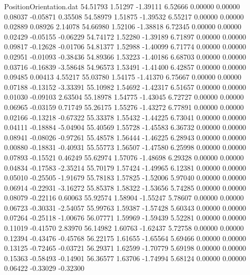 \begin{filecontents}{PositionOrientation.dat}
  54.51793    1.51297   -1.39111     6.52666    0.00000    0.00000    0.08037   -0.05871    0.35508
  54.58979    1.51875   -1.39532     6.55217    0.00000    0.00000    0.02889    0.08926    2.14078
  54.66980    1.52106   -1.38818     6.72345    0.00000    0.00000    0.02429   -0.05155   -0.06229
  54.74172    1.52280   -1.39189     6.71897    0.00000    0.00000    0.09817   -0.12628   -0.01706
  54.81377    1.52988   -1.40099     6.71774    0.00000    0.00000    0.02951   -0.01093   -0.38436
  54.89366    1.53223   -1.40186     6.68703    0.00000    0.00000    0.03716   -0.16839   -3.58648
  54.96573    1.53491   -1.41400     6.42857    0.00000    0.00000    0.09485    0.00413    4.55217
  55.03780    1.54175   -1.41370     6.75667    0.00000    0.00000    0.07188   -0.13152   -3.33391
  55.10982    1.54692   -1.42317     6.51657    0.00000    0.00000    0.01030   -0.09103    2.63504
  55.18978    1.54775   -1.43045     6.72727    0.00000    0.00000    0.06965   -0.03159    0.71749
  55.26175    1.55276   -1.43272     6.77891    0.00000    0.00000    0.02166   -0.13218   -0.67322
  55.33378    1.55432   -1.44225     6.73041    0.00000    0.00000    0.04111   -0.18884   -5.04904
  55.40569    1.55728   -1.45583     6.36732    0.00000    0.00000    0.08941   -0.08026   -0.97261
  55.48578    1.56444   -1.46225     6.28943    0.00000    0.00000    0.00880   -0.18831   -0.40931
  55.55773    1.56507   -1.47580     6.25998    0.00000    0.00000    0.07893   -0.15521    0.46249
  55.62974    1.57076   -1.48698     6.29328    0.00000    0.00000    0.04834   -0.17583   -2.35214
  55.70179    1.57424   -1.49965     6.12381    0.00000    0.00000    0.05010   -0.25505   -1.91679
  55.78183    1.57825   -1.52006     5.97040    0.00000    0.00000    0.06914   -0.22931   -3.16272
  55.85378    1.58322   -1.53656     5.74285    0.00000    0.00000    0.08079   -0.22116    0.60063
  55.92574    1.58904   -1.55247     5.78607    0.00000    0.00000    0.06723   -0.30331   -2.54057
  55.99763    1.59387   -1.57428     5.60343    0.00000    0.00000    0.07264   -0.25118   -1.00676
  56.07771    1.59969   -1.59439     5.52281    0.00000    0.00000    0.11019   -0.41570    2.83970
  56.14982    1.60763   -1.62437     5.72758    0.00000    0.00000    0.12394   -0.43476   -0.45768
  56.22175    1.61655   -1.65564     5.69466    0.00000    0.00000    0.13125   -0.72465   -0.03721
  56.29371    1.62599   -1.70779     5.69198    0.00000    0.00000    0.15363   -0.58493   -0.14901
  56.36577    1.63706   -1.74994     5.68124    0.00000    0.00000    0.06422   -0.33029   -0.32300

\end{filecontents}
